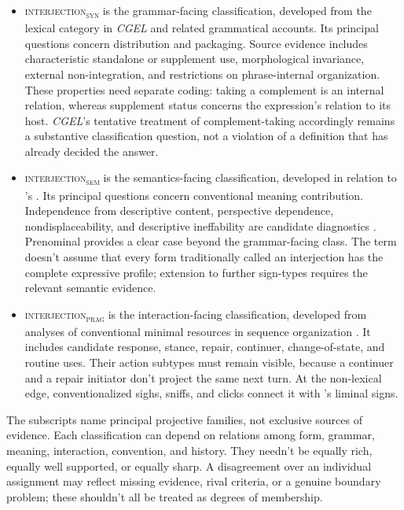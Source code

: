 \documentclass[12pt]{article}
\newcommand{\intj}[1]{\textsc{interjection\textsubscript{#1}}}
\begin{document}
\begin{itemize}
\item \intj{syn} is the grammar-facing classification, developed from the lexical category in \textit{CGEL} and related grammatical accounts. Its principal questions concern distribution and packaging. Source evidence includes characteristic standalone or supplement use, morphological invariance, external non-integration, and restrictions on phrase-internal organization. These properties need separate coding: taking a complement is an internal relation, whereas supplement status concerns the expression's relation to its host. \textit{CGEL}'s tentative treatment of complement-taking  accordingly remains a substantive classification question, not a violation of a definition that has already decided the answer.
\item \intj{sem} is the semantics-facing classification, developed in relation to \textcite{potts2007}'s . Its principal questions concern conventional meaning contribution. Independence from descriptive content, perspective dependence, nondisplaceability, and descriptive ineffability are candidate diagnostics \citep[166]{potts2007}. Prenominal  provides a clear case beyond the grammar-facing class. The term doesn't assume that every form traditionally called an interjection has the complete expressive profile; extension to further sign-types requires the relevant semantic evidence.
\item \intj{prag} is the interaction-facing classification, developed from analyses of conventional minimal resources in sequence organization \citep[265]{dingemanse2024}. It includes candidate response, stance, repair, continuer, change-of-state, and routine uses. Their action subtypes must remain visible, because a continuer and a repair initiator don't project the same next turn. At the non-lexical edge, conventionalized sighs, sniffs, and clicks connect it with \textcite{dingemanse2020}'s liminal signs.
\end{itemize}

The subscripts name principal projective families, not exclusive sources of evidence. Each classification can depend on relations among form, grammar, meaning, interaction, convention, and history. They needn't be equally rich, equally well supported, or equally sharp. A disagreement over an individual assignment may reflect missing evidence, rival criteria, or a genuine boundary problem; these shouldn't all be treated as degrees of membership.
\end{document}

